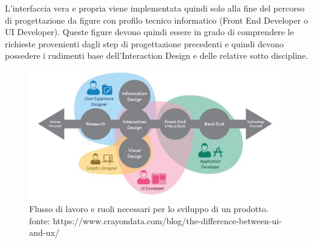 L'interfaccia vera e propria viene implementata quindi solo alla fine del percorso di progettazione da figure con profilo tecnico informatico (Front End Developer o UI Developer). Queste figure devono quindi essere in grado di comprendere le richieste provenienti dagli step di progettazione precedenti e quindi devono possedere i rudimenti base dell'Interaction Design e delle relative sotto discipline.

\begin{figure}[!h]
	\centering
	\includegraphics[width=\textwidth]{../immagini/UX_and_UI.png}
	\caption{Flusso di lavoro e ruoli necessari per lo sviluppo di un prodotto. fonte: https://www.crayondata.com/blog/the-difference-between-ui-and-ux/
}
\end{figure}

